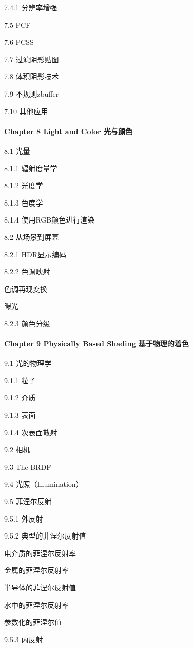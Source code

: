 \documentclass[
  paper=a4,
  ,captions=tableheading
]{scrartcl}
\begin{document}
7.4.1 分辨率增强

7.5 PCF

7.6 PCSS

7.7 过滤阴影贴图

7.8 体积阴影技术

7.9 不规则zbuffer

7.10 其他应用

\paragraph{Chapter 8 Light and Color
光与颜色}\label{chapter-8-light-and-color-ux5149ux4e0eux989cux8272}

8.1 光量

8.1.1 辐射度量学

8.1.2 光度学

8.1.3 色度学

8.1.4 使用RGB颜色进行渲染

8.2 从场景到屏幕

8.2.1 HDR显示编码

8.2.2 色调映射

色调再现变换

曝光

8.2.3 颜色分级

\paragraph{Chapter 9 Physically Based Shading
基于物理的着色}\label{chapter-9-physically-based-shading-ux57faux4e8eux7269ux7406ux7684ux7740ux8272}

9.1 光的物理学

9.1.1 粒子

9.1.2 介质

9.1.3 表面

9.1.4 次表面散射

9.2 相机

9.3 The BRDF

9.4 光照（Illumination）

9.5 菲涅尔反射

9.5.1 外反射

9.5.2 典型的菲涅尔反射值

电介质的菲涅尔反射率

金属的菲涅尔反射率

半导体的菲涅尔反射值

水中的菲涅尔反射率

参数化的菲涅尔值

9.5.3 内反射
\end{document}
